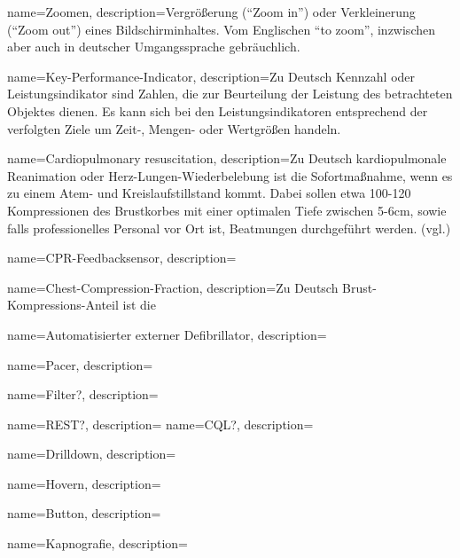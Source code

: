 

{
     name=Zoomen,
     description={Vergrößerung ("`Zoom in"') oder Verkleinerung ("`Zoom out"') eines Bildschirminhaltes. Vom Englischen "`to zoom"', inzwischen aber auch in deutscher Umgangssprache gebräuchlich.}
}

{
     name=Key-Performance-Indicator,
     description={Zu Deutsch Kennzahl oder Leistungsindikator sind \glqq Zahlen, die zur Beurteilung der Leistung des betrachteten Objektes dienen. Es kann sich bei den Leistungsindikatoren entsprechend der verfolgten Ziele um Zeit-, Mengen- oder Wertgrößen handeln.\grqq{}  \cite[S. 342, S. 3f]{Friedl.2003, Maute.2009} }
}

{
     name=Cardiopulmonary resuscitation,
     description={Zu Deutsch kardiopulmonale Reanimation oder Herz-Lungen-Wiederbelebung ist die Sofortmaßnahme, wenn es zu einem Atem- und Kreislaufstillstand kommt. Dabei sollen etwa 100-120 Kompressionen des Brustkorbes mit einer optimalen Tiefe zwischen 5-6cm, sowie falls professionelles Personal vor Ort ist, Beatmungen durchgeführt werden. (vgl.\cite{Nolan.2010, Monsieurs.2015}) }
}

{
     name=CPR-Feedbacksensor,
     description={\todo }
}

{
     name=Chest-Compression-Fraction,
     description={Zu Deutsch Brust-Kompressions-Anteil ist die \todo }
}

{
     name=Automatisierter externer Defibrillator,
     description={\todo }
}

{
     name=Pacer,
     description={\todo }
}

{
     name=Filter?,
     description={\todo }
}

{
     name=REST?,
     description={\todo }
}
{
     name=CQL?,
     description={\todo }
}

{
     name=Drilldown,
     description={\todo }
}

{
     name=Hovern,
     description={\todo }
}

{
     name=Button,
     description={\todo }
}

{
     name=Kapnografie,
     description={\todo }
}

